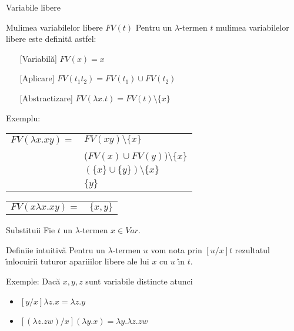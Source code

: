\documentclass[xcolor=pdftex,romanian,colorlinks]{beamer}
\begin{document}
\begin{frame}[fragile]{ Variabile libere}


\begin{block}{Mul\ts imea variabilelor libere $FV(t)$}
Pentru un $\lambda$-termen $t$ mul\ts imea variabilelor libere este definit\u a astfel:
\begin{itemize}
\item[][Variabil\u a] $FV(x)={x}$
\item[][Aplicare] $FV(t_1 t_2) = FV(t_1)\cup FV(t_2)$
\item[][Abstractizare] $FV(\lambda x.t)=FV(t)\setminus \{x\}$
\end{itemize}
\end{block}

Exemplu:

\begin{tabular}{ll}
$FV(\lambda x. xy) =$ & $FV (x y) \setminus \{x\}$ \\
            & ($FV(x)\cup FV(y))\setminus \{x\}$\\
            & $(\{x\}\cup \{y\}) \setminus \{x\}$\\
            & $\{y\}$
\end{tabular}
\pause

\begin{tabular}{ll}
$FV(x\lambda x. xy) =$ & \pause $\{x, y\}$
\end{tabular}
\end{frame}

\begin{frame}[fragile]{ Substitu\ts ii}
Fie $t$ un  $\lambda$-termen $x\in Var$. 

\begin{block}{Defini\ts ie intuitiv\u a}
Pentru un $\lambda$-termen $u$ vom nota prin $[u/x]t$ rezultatul \^{\i}nlocuirii tuturor apari\ts iilor libere ale  lui $x$ cu $u$ \^{\i}n $t$.
\end{block}


Exemple:
Dac\u a $x,y,z$ sunt variabile distincte atunci
\begin{itemize}
\item $[y/x]\lambda z. x=\lambda z. y$ 
 
\item $[(\lambda z.zw)/x](\lambda y.x)= \lambda y. \lambda z. zw$

\end{itemize}
\end{frame}
\end{document}
